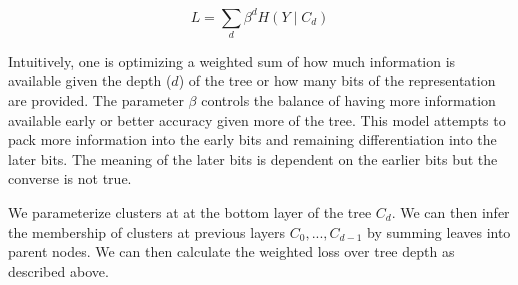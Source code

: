 \documentclass[11pt,letterpaper]{article}
\begin{document}
$$ L = \sum_d \beta ^ d  H(Y \mid C_d) $$

Intuitively, one is optimizing a weighted sum of how much information is available given the depth ($d$) of the tree or how many bits of the representation are provided. The parameter $\beta$ controls the balance of having more information available early or better accuracy given more of the tree. This model attempts to pack more information into the early bits and remaining differentiation into the later bits. The meaning of the later bits is dependent on the earlier bits but the converse is not true.

We parameterize clusters at at the bottom layer of the tree $C_d$. We can then infer the membership of clusters at previous layers $C_0,...,C_{d-1}$ by summing leaves into parent nodes. We can then calculate the weighted loss over tree depth as described above.



\end{document}
